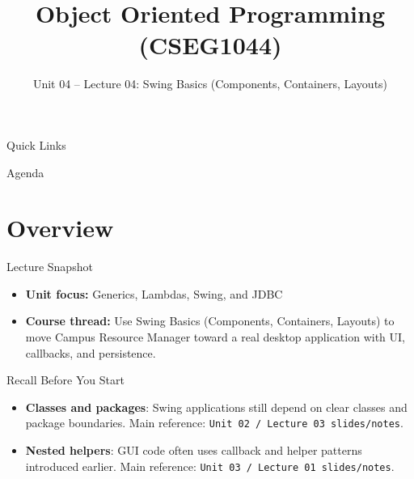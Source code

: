 \documentclass{beamer}
\title[OOPS with Java]{Object Oriented Programming (CSEG1044)}
\subtitle{Unit 04 -- Lecture 04: Swing Basics (Components, Containers, Layouts)}
\begin{document}
\begin{frame}[fragile]
  \titlepage
  \vspace{0.5em}
  \slidesources{\OOPSUnitIVSources}
\end{frame}

\begin{frame}{Quick Links}
  \centering
  \hyperlink{sec:overview}{}\hspace{0.6em}
  \hyperlink{sec:concepts}{}\hspace{0.6em}
  \hyperlink{sec:demo}{}\hspace{0.6em}
  \hyperlink{sec:summary}{}
  \slidesources{\OOPSUnitIVSources}
\end{frame}

\begin{frame}{Agenda}
  \tableofcontents
  \slidesources{\OOPSUnitIVSources}
\end{frame}

\section{Overview}
\label{sec:overview}

\begin{frame}{Lecture Snapshot}
\begin{itemize}[<+->]
  \item \textbf{Unit focus:} Generics, Lambdas, Swing, and JDBC
  \item \textbf{Course thread:} Use Swing Basics (Components, Containers, Layouts) to move Campus Resource Manager toward a real desktop application with UI, callbacks, and persistence.
\end{itemize}
  \slidesources{\OOPSUnitIVSources}
\end{frame}

\begin{frame}{Recall Before You Start}
\begin{itemize}[<+->]
  \item \textbf{Classes and packages}: Swing applications still depend on clear classes and package boundaries. Main reference: \texttt{Unit 02 / Lecture 03 slides/notes}.
  \item \textbf{Nested helpers}: GUI code often uses callback and helper patterns introduced earlier. Main reference: \texttt{Unit 03 / Lecture 01 slides/notes}.
\end{itemize}
  \slidesources{\OOPSUnitIVSources}
\end{frame}
\end{document}
